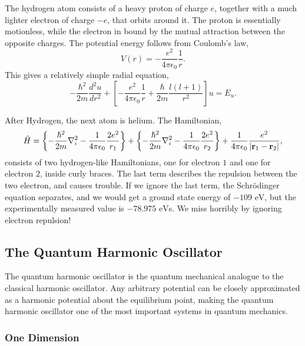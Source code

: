 The hydrogen atom consists of a heavy proton of charge $e$, together 
with a much lighter electron of charge $-e$, that orbits around it. The proton is 
essentially motionless, while the electron 
in bound by the mutual attraction between the opposite charges. The potential energy 
follows from Coulomb's law,
\begin{equation}
    V(r) = - \frac{e^2}{4\pi \epsilon_0}\frac{1}{r}.
\end{equation}
This gives a relatively simple radial equation,
\begin{equation}
    -\frac{\hbar^2}{2m}\frac{d^2u}{dr^2}
    + \left[
        - \frac{e^2}{4\pi\epsilon_0}\frac{1}{r} 
        + \frac{\hbar}{2m}\frac{l(l + 1)}{r^2}
    \right]
    u = E_u.
\end{equation}

After Hydrogen, the next atom is helium. The Hamiltonian,
\begin{equation}
    \hat{H} =
    \left\{
        -\frac{\hbar^2}{2m}\nabla^2_i
        -\frac{1}{4\pi\epsilon_0} \frac{2e^2}{r_1}
    \right\}
    +
    \left\{
        -\frac{\hbar^2}{2m}\nabla^2_i
        -\frac{1}{4\pi\epsilon_0} \frac{2e^2}{r_2}
    \right\}
    +
    \frac{1}{4\pi\epsilon_0}\frac{e^2}{|\vb{r}_1 - \vb{r}_2|},
\end{equation}
consists of two hydrogen-like Hamiltonians, one for electron $1$ and one for 
electron $2$, inside curly braces. The last term describes the repulsion between 
the two electron, and causes trouble. If we ignore the last term, the Schrödinger
equation separates, and we would get a ground state energy of $-109 \text{ eV}$,
but the experimentally measured value is $-78.975 \text{ eV}$s. We miss horribly by 
ignoring electron repulsion!

\subsection{The Quantum Harmonic Oscillator}

The quantum harmonic oscillator is the quantum mechanical analogue to the 
classical harmonic oscillator. Any arbitrary potential can be closely 
approximated as a harmonic potential about the equilibrium point, making the 
quantum harmonic oscillator one of the most important systems in quantum mechanics.

\subsubsection{One Dimension}

